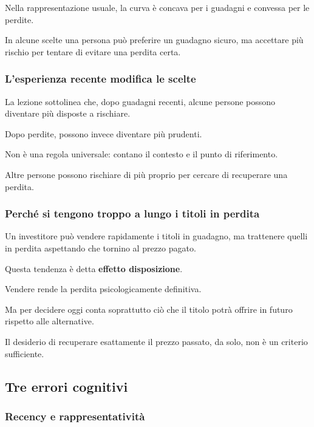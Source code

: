 \noindent Nella rappresentazione usuale,
la curva è concava per i guadagni
e convessa per le perdite.

\noindent In alcune scelte una persona
può preferire un guadagno sicuro,
ma accettare più rischio
per tentare di evitare una perdita certa.


\subsubsection*{L'esperienza recente modifica le scelte}

\noindent La lezione sottolinea che,
dopo guadagni recenti,
alcune persone possono diventare
più disposte a rischiare.

\noindent Dopo perdite,
possono invece diventare più prudenti.

\noindent Non è una regola universale:
contano il contesto
e il punto di riferimento.

\noindent Altre persone possono rischiare di più
proprio per cercare di recuperare una perdita.


\subsubsection*{Perché si tengono troppo a lungo
i titoli in perdita}

\noindent Un investitore può vendere rapidamente
i titoli in guadagno,
ma trattenere quelli in perdita
aspettando che tornino al prezzo pagato.

\noindent Questa tendenza è detta
\textbf{effetto disposizione}.

\medskip

\noindent Vendere rende la perdita
psicologicamente definitiva.

\noindent Ma per decidere oggi
conta soprattutto ciò che il titolo
potrà offrire in futuro
rispetto alle alternative.

\noindent Il desiderio di recuperare
esattamente il prezzo passato,
da solo, non è un criterio sufficiente.


\subsection{Tre errori cognitivi}

\subsubsection*{Recency e rappresentatività}

